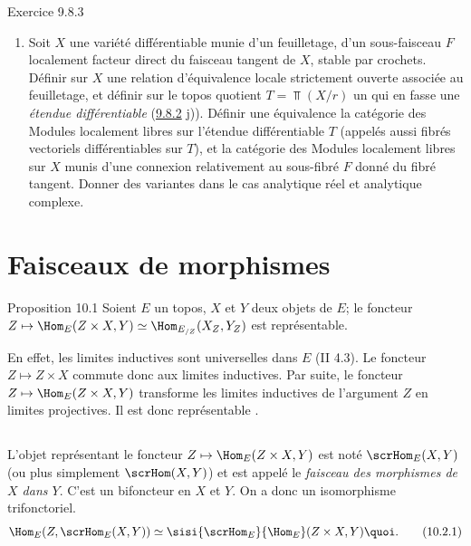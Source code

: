 \documentclass[10pt]{../fichiers-configuration-latex/smfart}
\begin{document}
\begin{enonce*}[remark]{Exercice 9.8.3}
\begin{enumerate}
\item Soit $X$ une variété différentiable munie d'un feuilletage, \ie
     d'un sous-faisceau $F$ localement facteur direct du faisceau
     tangent de $X$, stable par crochets. Définir sur $X$ une relation
     d'équivalence locale strictement ouverte associée au feuilletage,
     et définir sur le topos quotient $T=\Top(X/r)$ un  qui en
     fasse une \emph{étendue différentiable} (\hyperref[IV.exer9.8.2]{9.8.2} j)). Définir une
     équivalence  la catégorie des Modules localement libres sur
     l'étendue différentiable $T$ (appelés aussi fibrés vectoriels
     différentiables sur $T$), et la catégorie des Modules localement
     libres sur $X$ munis d'une connexion relativement au sous-fibré
     $F$ donné du fibré tangent. Donner des variantes dans le cas
     analytique réel et analytique complexe.
\end{enumerate}
\end{enonce*}

\section{Faisceaux de morphismes}\pageoriginale

\begin{enonce*}{Proposition 10.1}
Soient $E$ un topos, $X$ et $Y$ deux objets de $E$; le foncteur
$Z\mapsto \Hom_E(Z\times X,Y)\simeq \Hom_{E_{/Z}}(X_Z, Y_Z)$ est
représentable.
\end{enonce*}

En effet, les limites inductives sont universelles dans $E$ (II
4.3). Le foncteur $Z\mapsto Z\times X$ commute donc aux limites
inductives. Par suite, le foncteur $Z\mapsto \Hom_E(Z\times X,Y)$
transforme les limites inductives de l'argument $Z$ en limites
projectives. Il est donc représentable .

\setcounter{subsection}{1}
\subsection{}
L'objet représentant le foncteur $Z\mapsto \Hom_{E}(Z\times X, Y)$
est noté $\scrHom_{E}(X,Y)$ (ou plus simplement $\scrHom(X,Y)$) et
est appelé le \emph{faisceau des morphismes de $X$ dans $Y$}. C'est
un bifoncteur en $X$ et $Y$. On a donc un isomorphisme
trifonctoriel.
\begin{equation*}
\Hom_E(Z,\scrHom_E(X,Y))\simeq \sisi{\scrHom_E}{\Hom_E}(Z\times X,
Y){\quoi}.\tag{10.2.1}
\end{equation*}
\end{document}
